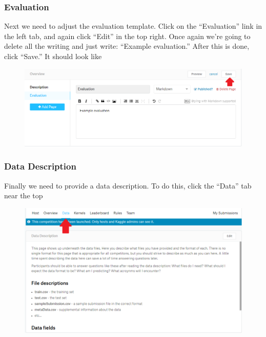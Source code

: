 \documentclass{article}
\begin{document}
\subsubsection{Evaluation}\label{evaluation}

Next we need to adjust the evaluation template. Click on the
``Evaluation'' link in the left tab, and again click ``Edit'' in the top
right. Once again we're going to delete all the writing and just write:
``Example evaluation.'' After this is done, click ``Save.'' It should
look like

\begin{figure}[H]
    \centering
    \includegraphics[width=\linewidth]{figures/example-evaluation.PNG}
\end{figure}

\subsubsection{Data Description}\label{data-description}

Finally we need to provide a data description. To do this, click the
``Data'' tab near the top

\begin{figure}[H]
    \centering
    \includegraphics[width=\linewidth]{figures/data-description-link.PNG}
\end{figure}
\end{document}
